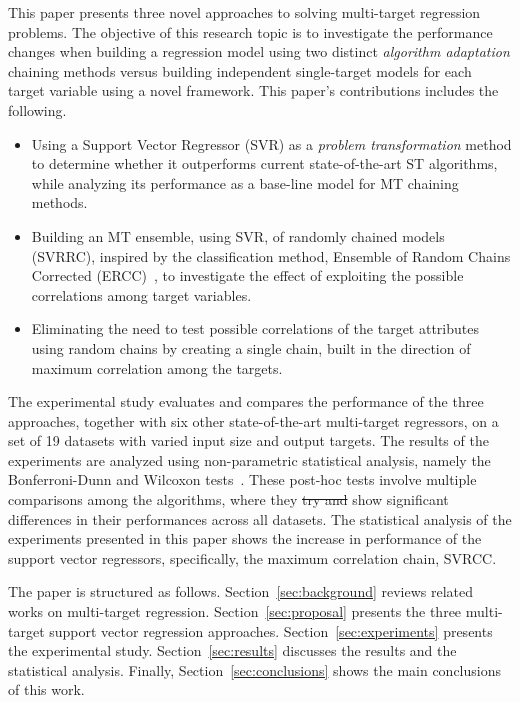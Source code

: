 \documentclass[preprint,12pt]{elsarticle}
\begin{document}
This paper presents three novel approaches to solving multi-target regression problems. The objective of this research topic is to investigate the performance changes when building a regression model using two distinct \textit{algorithm adaptation} chaining methods versus building independent single-target models for each target variable using a novel framework. This paper's contributions includes the following.
\begin{itemize}
\item Using a Support Vector Regressor (SVR) as a \textit{problem transformation} method to determine whether it outperforms current state-of-the-art ST algorithms, while analyzing its performance as a base-line model for MT chaining methods.
\item Building an MT ensemble, using SVR, of randomly chained models (SVRRC), inspired by the classification method, Ensemble of Random Chains Corrected (ERCC)~\cite{Xiong2014}, to investigate the effect of exploiting the possible correlations among target variables.
\item Eliminating the need to test possible correlations of the target attributes using random chains by creating a single chain, built in the direction of maximum correlation among the targets.
\end{itemize}

The experimental study evaluates and compares the performance of the three approaches, together with six other state-of-the-art multi-target regressors, on a set of 19 datasets with varied input size and output targets. The results of the experiments are analyzed using non-parametric statistical analysis, namely the Bonferroni-Dunn and Wilcoxon tests~\cite{Garcia20102044}. These post-hoc tests involve multiple comparisons among the algorithms, where they \st{try and} show significant differences in their performances across all datasets. The statistical analysis of the experiments presented in this paper shows the increase in performance of the support vector regressors, specifically, the maximum correlation chain, SVRCC.

The paper is structured as follows. Section~\ref{sec:background} reviews related works on multi-target regression. Section~\ref{sec:proposal} presents the three multi-target support vector regression approaches. Section~\ref{sec:experiments} presents the experimental study. Section~\ref{sec:results} discusses the results and the statistical analysis. Finally, Section~\ref{sec:conclusions} shows the main conclusions of this work.
\end{document}
